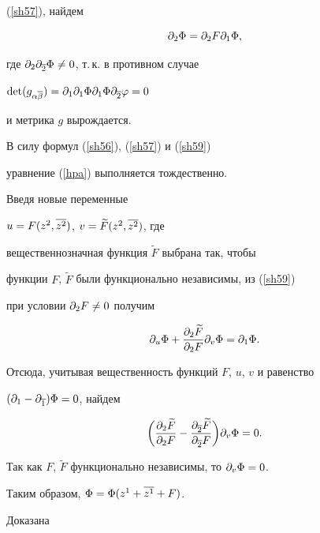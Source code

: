 (\ref{sh57}), найдем


\begin{equation}


\label{sh59}


\pl 2\Phi= \pl 2 F\pl 1 \Phi,


\end{equation}


где $\partial_ 2\partial_ {\overline 2} \Phi\neq 0$, т.\,к. в противном случае


$ \det (g_{\alpha\ol\beta})= \pl 1 \pl 1 \Phi\pl 1\Phi\pl{\ol


2}\varphi =0 $


и метрика $g$ вырождается.


В силу формул (\ref{sh56}), (\ref{sh57}) и (\ref{sh59})


уравнение (\ref{hpa}) выполняется тождественно.





Введя новые переменные


$u=F(z^2,\overline{z^2})$, $v=\widetilde F (z^2,\overline{z^2})$, где


вещественнозначная функция $\widetilde F$ выбрана так, чтобы


функции $F$, $\widetilde F$ были функционально независимы, из (\ref{sh59})


при условии $\partial_ 2 F\neq 0$ получим


$$


\pl u\Phi+\frac{\pl 2 \widetilde F}{\pl 2 F}\pl v\Phi=\pl 1\Phi.


$$


Отсюда, учитывая вещественность функций $F$, $u$, $v$ и равенство


$(\partial_1-\partial_{\overline{1}})\Phi=0$, найдем


$$


\biggl(\frac{\pl 2\widetilde F}{\pl 2 F}-


\frac{\pl{\ol{2}}\widetilde F}{\pl{\ol 2} F}\biggr)\pl{v}\Phi=0.


$$


Так как $F$, $\widetilde F$ функционально независимы, то $\partial_ v\Phi=0$.


Таким образом, $\Phi =\Phi(z^1+\overline{z^1} +F)$.


Доказана





